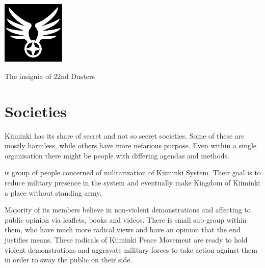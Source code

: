 \documentclass{tufte-book}
\begin{document}
\bigskip
{}

\begin{marginfigure}[0\baselineskip]
  \includegraphics[width=3cm]{winged-emblem}
  \caption{The insignia of 22nd Dusters}
  \label{fig:dusters}
\end{marginfigure}

\chapter{Societies}
\label{ch:societies}

 Kiiminki has its share of secret and not so
secret societies. Some of these are mostly harmless, while others have more
nefarious purpose. Even within a single organisation there might be people
with differing agendas and methods.

 is group of people concerned of
militarization of Kiiminki System. Their goal is to reduce military presence
in the system and eventually make Kingdom of Kiiminki a place without standing
army.

Majority of its members believe in non-violent demonstrations and affecting to
public opinion via leaflets, books and videos. There is small sub-group within
them, who have much more radical views and have an opinion that the end
justifies means. These radicals of Kiiminki Peace Movement are ready to hold
violent demonstrations and aggravate military forces to take action against
them in order to sway the public on their side.
\end{document}
